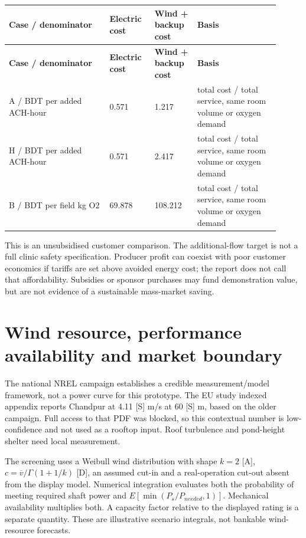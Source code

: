 \documentclass[11pt,a4paper]{article}
\begin{document}
{\small
\setlength{\tabcolsep}{3pt}\renewcommand{\arraystretch}{1.18}
\begin{longtable}{@{}>{\raggedright\arraybackslash}p{0.3343\linewidth}>{\raggedright\arraybackslash}p{0.1486\linewidth}>{\raggedright\arraybackslash}p{0.1486\linewidth}>{\raggedright\arraybackslash}p{0.2786\linewidth}@{}}
\toprule \textbf{Case / denominator} & \textbf{Electric cost} & \textbf{Wind + backup cost} & \textbf{Basis} \\ \midrule
\endfirsthead\toprule \textbf{Case / denominator} & \textbf{Electric cost} & \textbf{Wind + backup cost} & \textbf{Basis} \\ \midrule
\endhead\bottomrule\endfoot
A / BDT per added ACH-hour & \num{0.571} & \num{1.217} & [D] total cost / total service, same room volume or oxygen demand \\
H / BDT per added ACH-hour & \num{0.571} & \num{2.417} & [D] total cost / total service, same room volume or oxygen demand \\
B / BDT per field kg O2 & \num{69.878} & \num{108.212} & [D] total cost / total service, same room volume or oxygen demand \\
\end{longtable}}
This is an unsubsidised customer comparison. The additional-flow target is not a full clinic safety specification. Producer profit can coexist with poor customer economics if tariffs are set above avoided energy cost; the report does not call that affordability. Subsidies or sponsor purchases may fund demonstration value, but are not evidence of a sustainable mass-market saving.

\clearpage\section{Wind resource, performance availability and market boundary}
The national NREL campaign establishes a credible measurement/model framework, not a power curve for this prototype. The EU study indexed appendix reports Chandpur at \num{4.11} [S] m/s at \num{60} [S] m, based on the older campaign. Full access to that PDF was blocked, so this contextual number is low-confidence and not used as a rooftop input. Roof turbulence and pond-height shelter need local measurement. \cite{windrepo,euwind,windguide}

The screening uses a Weibull wind distribution with shape $k=2$ [A], $c=\overline v/\Gamma(1+1/k)$ [D], an assumed cut-in and a real-operation cut-out absent from the display model. Numerical integration evaluates both the probability of meeting required shaft power and $E[\min(P_s/P_{needed},1)]$. Mechanical availability multiplies both. A capacity factor relative to the displayed rating is a separate quantity. These are illustrative scenario integrals, not bankable wind-resource forecasts.
\end{document}
